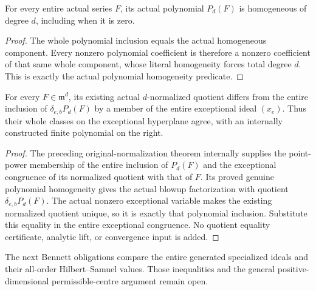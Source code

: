 \begin{lemma}
\label{hir:actual-point-initial-polynomial-homogeneous}
\leanok
For every entire actual series $F$, its actual polynomial $P_d(F)$ is
homogeneous of degree $d$, including when it is zero.
\end{lemma}
\begin{proof}
The whole polynomial inclusion equals the actual homogeneous component.
Every nonzero polynomial coefficient is therefore a nonzero coefficient of
that same whole component, whose literal homogeneity forces total degree
$d$. This is exactly the actual polynomial homogeneity predicate.
\end{proof}

\begin{theorem}
\label{hir:actual-point-exceptional-restriction-dehomogenized-polynomial}
\leanok
For every $F\in\mathfrak m^d$, its existing actual $d$-normalized quotient
differs from the entire inclusion of $\delta_{e,b}P_d(F)$ by a member of
the entire exceptional ideal $(x_e)$. Thus their whole classes on the
exceptional hyperplane agree, with an internally constructed finite
polynomial on the right.
\end{theorem}
\begin{proof}
The preceding original-normalization theorem internally supplies the
point-power membership of the entire inclusion of $P_d(F)$ and the
exceptional congruence of its normalized quotient with that of $F$.
Its proved genuine polynomial homogeneity gives the actual blowup
factorization with quotient $\delta_{e,b}P_d(F)$. The actual nonzero
exceptional variable makes the existing normalized quotient unique, so it
is exactly that polynomial inclusion. Substitute this equality in the
entire exceptional congruence. No quotient equality certificate, analytic
lift, or convergence input is added.
\end{proof}

The next Bennett obligations compare the entire generated specialized
ideals and their all-order Hilbert--Samuel values. Those inequalities and
the general positive-dimensional permissible-centre argument remain open.
